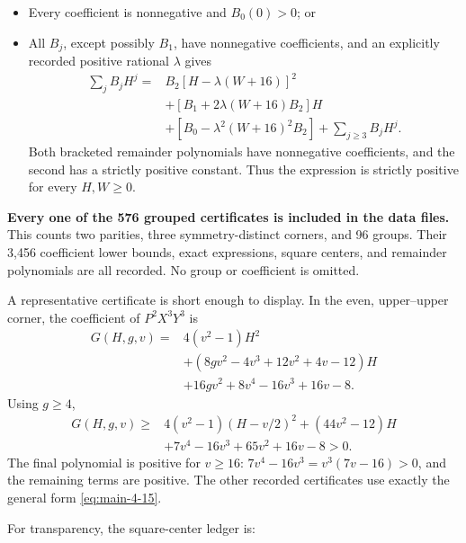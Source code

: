 \documentclass[11pt,letterpaper]{article}
\providecommand{\tightlist}{\setlength{\itemsep}{0.12em}\setlength{\parskip}{0pt}}
\theoremstyle{plain}
\begin{document}
\begin{itemize}
\tightlist
\item
  Every coefficient is nonnegative and \(B_0(0)>0\); or
\item
  All \(B_j\), except possibly \(B_1\), have nonnegative coefficients, and an explicitly recorded positive rational \(\lambda\) gives \[
  \begin{aligned}
  \sum_jB_jH^j={}&B_2[H-\lambda(W+16)]^2\\
  &+[B_1+2\lambda(W+16)B_2]H\\
  &+[B_0-\lambda^2(W+16)^2B_2]
   +\sum_{j\ge3}B_jH^j.
  \end{aligned}
  \tag{4.15}\label{eq:main-4-15}
  \] Both bracketed remainder polynomials have nonnegative coefficients, and the second has a strictly positive constant. Thus the expression is strictly positive for every \(H,W\ge0\).
\end{itemize}

\textbf{Every one of the 576 grouped certificates is included in the data files.} This counts two parities, three symmetry-distinct corners, and 96 groups. Their 3,456 coefficient lower bounds, exact expressions, square centers, and remainder polynomials are all recorded. No group or coefficient is omitted.

A representative certificate is short enough to display. In the even, upper--upper corner, the coefficient of \(P^2X^3Y^3\) is \[
\begin{aligned}
G(H,g,v)={}&4(v^2-1)H^2\\
&+(8gv^2-4v^3+12v^2+4v-12)H\\
&+16gv^2+8v^4-16v^3+16v-8.
\end{aligned}
\] Using \(g\ge4\), \[
\begin{aligned}
G(H,g,v)\ge{}&4(v^2-1)(H-v/2)^2
 +(44v^2-12)H\\
&+7v^4-16v^3+65v^2+16v-8>0.
\end{aligned}
\tag{4.16}\label{eq:main-4-16}
\] The final polynomial is positive for \(v\ge16\): \(7v^4-16v^3=v^3(7v-16)>0\), and the remaining terms are positive. The other recorded certificates use exactly the general form \eqref{eq:main-4-15}.

For transparency, the square-center ledger is:
\end{document}
